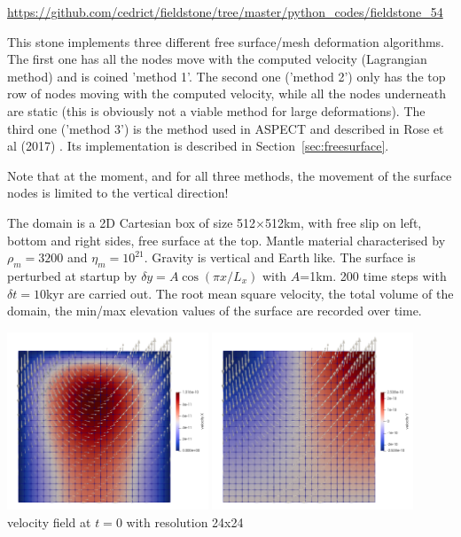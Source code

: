 \url{https://github.com/cedrict/fieldstone/tree/master/python_codes/fieldstone_54}

\vspace{1cm}

This stone implements three different free surface/mesh deformation algorithms. 
The first one has all the nodes move with the computed velocity (Lagrangian method)
and is coined 'method 1'. 
The second one ('method 2') only has the top row of nodes moving with the computed velocity, 
while all the nodes underneath are static (this is obviously not a viable method for 
large deformations). 
The third one ('method 3') is the method used in ASPECT and described in Rose et al (2017) \cite{robh17}.
Its implementation is described in Section~\ref{sec:freesurface}.

Note that at the moment, and for all three methods, the movement of the surface nodes is limited 
to the vertical direction!

The domain is a 2D Cartesian box of size 512$\times$512km, with free slip on left, 
bottom and right sides, free surface at the top. 
Mantle material characterised by $\rho_m=3200$ and $\eta_m=10^{21}$. 
Gravity is vertical and Earth like. 
The surface is perturbed at startup by $\delta y = A \cos (\pi x /L_x)$ with $A$=1km.
200 time steps with $\delta t=10$kyr are carried out.
The root mean square velocity, the total volume of the domain, the min/max elevation
values of the surface are recorded over time. 

\begin{center}
\includegraphics[width=6cm]{python_codes/fieldstone_54/images/u}
\includegraphics[width=6cm]{python_codes/fieldstone_54/images/v}\\
{\scriptsize velocity field at $t=0$ with resolution 24x24}
\end{center}

